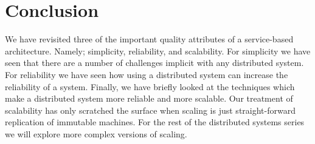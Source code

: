 \section{Conclusion}
We have revisited three of the important quality attributes of a service-based architecture.
Namely; simplicity, reliability, and scalability.
For simplicity we have seen that there are a number of challenges implicit with any distributed system.
For reliability we have seen how using a distributed system can increase the reliability of a system.
Finally, we have briefly looked at the techniques which make a distributed system more reliable and more scalable.
Our treatment of scalability has only scratched the surface when scaling is just straight-forward replication of immutable machines.
For the rest of the distributed systems series we will explore more complex versions of scaling.
